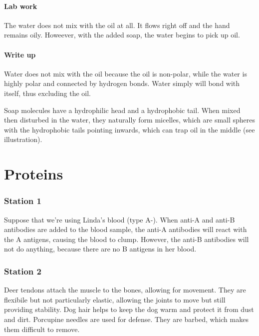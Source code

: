 \documentclass[12pt]{article}
\begin{document}
\subsection*{Lab work}
The water does not mix with the oil at all. It flows right off and the
hand remains oily. Howeever, with the added soap,
the water begins to pick up oil.

\subsection*{Write up}
Water does not mix with the oil because the oil is non-polar, 
while the water is highly polar and connected by hydrogen bonds. Water
simply will bond with itself, thus excluding the oil. 

Soap molecules have a hydrophilic head and a hydrophobic tail. When mixed then 
disturbed in the water, they naturally form
micelles, which are small spheres with the hydrophobic tails pointing inwards, 
which can trap oil in the middle (see illustration). 
\begin{center}
\end{center}

\part*{Proteins}

\section*{Station 1}
Suppose that we're using Linda's blood (type A-). 
When anti-A and anti-B antibodies are added to the blood sample, 
the anti-A antibodies will react with the A antigens, 
causing the blood to clump. However, the anti-B antibodies
will not do anything, because there are no B antigens in her 
blood.

\section*{Station 2}
Deer tendons attach the muscle to the bones, allowing for movement. 
They are flexibile but not particularly elastic, allowing the joints
to move but still providing stability. Dog hair helps to keep
the dog warm and protect it from dust and dirt. Porcupine needles are used for 
defense. They are barbed, which makes them difficult to remove.
\end{document}
